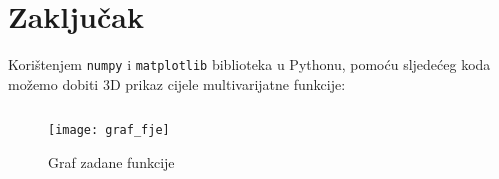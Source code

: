 \chapter{Zaključak}

Korištenjem \verb|numpy| i \verb|matplotlib| biblioteka u Pythonu, pomoću sljedećeg koda možemo dobiti 3D prikaz cijele multivarijatne funkcije:

\inputminted{python}{./code/graf_fje.py}

\begin{figure}
    \centering
    \texttt{[image: graf\_fje]}
    \caption{Graf zadane funkcije}
\end{figure}

\newpage